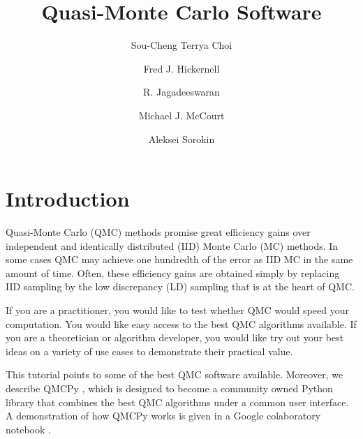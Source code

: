 \documentclass[graybox,footinfo]{svmult}
\begin{document}
\title*{Quasi-Monte Carlo Software}
\author{Sou-Cheng Terrya Choi \and Fred J. Hickernell \and R. Jagadeeswaran \and Michael J. McCourt \and Aleksei Sorokin}

\maketitle




\section{Introduction}
Quasi-Monte Carlo (QMC) methods promise great efficiency gains over independent and identically distributed (IID) Monte Carlo (MC) methods.  In some cases QMC may achieve one hundredth of the error as IID MC in the same amount of time. Often, these efficiency gains are obtained simply by  replacing IID sampling by the low discrepancy (LD) sampling that is at the heart of QMC. 

If you are a practitioner, you would like to test whether QMC would speed your computation.  You would like easy access to the best QMC algorithms available.  If you are a theoretician or algorithm developer, you would like try out your best ideas on a variety of use cases to demonstrate their practical value.  

This tutorial points to some of the best QMC software available.  Moreover, we describe QMCPy \cite{QMCPy2020a}, which is designed to become a community owned Python library that combines the best QMC algorithms under a common user interface.  A demonstration of how QMCPy works is given in a Google colaboratory notebook \cite{QMCPyTutColab2020}.
\end{document}
